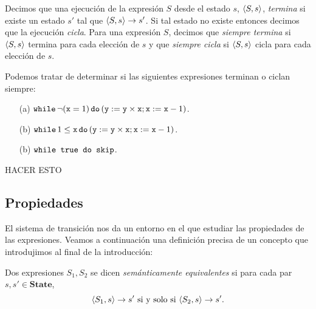 \begin{definition}
Decimos que una ejecución de la expresión $S$ desde el estado $s$, $\langle S, s \rangle$, \textit{termina} si existe un estado $s'$ tal que $\langle S, s \rangle\rightarrow s'$. Si tal estado no existe entonces decimos que la ejecución \textit{cicla}. Para una expresión $S$, decimos que \textit{siempre termina} si $\langle S, s \rangle$ termina para cada elección de $s$ y que \textit{siempre cicla} si $\langle S, s \rangle$ cicla para cada elección de $s$.
\end{definition}

\begin{example}
Podemos tratar de determinar si las siguientes expresiones terminan o ciclan siempre:
\begin{itemize}
    \item[(a)] $\texttt{while} \, \neg(\texttt{x}=1) \, \texttt{do} \, (\texttt{y} := \texttt{y} \times \texttt{x}; \texttt{x} := \texttt{x} - 1)$.
    \item[(b)] $\texttt{while} \, 1 \leq \texttt{x} \, \texttt{do} \, (\texttt{y} := \texttt{y} \times \texttt{x}; \texttt{x} := \texttt{x} - 1)$.
    \item[(b)] $\texttt{while true do skip}$.
\end{itemize}
HACER ESTO
\end{example}

\subsection{Propiedades}

El sistema de transición nos da un entorno en el que estudiar las propiedades de las expresiones. Veamos a continuación una definición precisa de un concepto que introdujimos al final de la introducción:
\begin{definition}
Dos expresiones $S_1, S_2$ se dicen \textit{semánticamente equivalentes} si para cada par $s, s' \in \mathbf{State}$, 
$$\langle S_1, s \rangle\rightarrow s' \text{ si y solo si } \langle S_2, s \rangle\rightarrow s'.$$
\end{definition}

